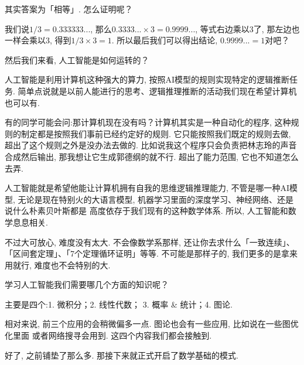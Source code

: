 其实答案为「相等」. 怎么证明呢？

我们说$1/3 = 0.333333 ... $,  那么$0.3333 ...  \times 3 = 0.9999 ... $,  等式右边乘以3了, 那左边也一样会乘以3,  得到$1/3 \times 3 =1$. 所以最后我们可以得出结论, $0.9999 ... =1$对吧？

然后我们来看, 人工智能是如何运转的？

人工智能是利用计算机这种强大的算力, 按照AI模型的规则实现特定的逻辑推断任务. 简单点说就是以前人能进行的思考、逻辑推理推断的活动我们现在希望计算机也可以有. 

有的同学可能会问:那计算机现在没有吗？计算机其实是一种自动化的程序, 这种规则的制定都是按照我们事前已经约定好的规则. 它只能按照我们既定的规则去做, 超出了这个规则之外是没办法去做的. 比如说我这个程序只会负责把林志玲的声音合成然后输出, 那我想让它生成郭德纲的就不行. 超出了能力范围, 它也不知道怎么去弄. 

人工智能就是希望他能让计算机拥有自我的思维逻辑推理能力, 不管是哪一种AI模型, 无论是现在特别火的大语言模型, 机器学习里面的深度学习、神经网络、还是说什么朴素贝叶斯都是
高度依存于我们现有的这种数学体系. 所以, 人工智能和数学息息相关. 

不过大可放心, 难度没有太大. 不会像数学系那样, 还让你去求什么「一致连续」、「区间套定理」、「7个定理循环证明」等等. 不可能是那样子的, 我们更多的是拿来用就行, 难度也不会特别的大. 

学习人工智能我们需要哪几个方面的知识呢？

主要是四个:1. 微积分；2. 线性代数； 3. 概率 \& 统计；4. 图论. 

相对来说, 前三个应用的会稍微偏多一点. 图论也会有一些应用, 比如说在一些图优化里面
或者网络搜寻会用到. 这四个内容我们都会接触到. 

好了, 之前铺垫了那么多. 那接下来就正式开启了数学基础的模式. 